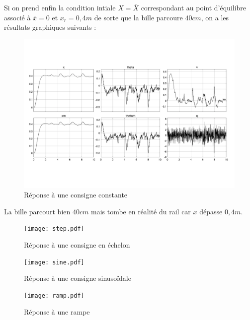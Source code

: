 \documentclass[10pt]{article}
\begin{document}
\noindent Si on prend enfin la condition intiale $X = \bar X$ correspondant au point d'équilibre associé à $\bar x = 0$
et $x_r = 0,4 m$ de sorte que la bille parcoure $40 cm$, on a les résultats graphiques suivants :

\begin{figure}[H]
	\centering
	\includegraphics[width=\linewidth]{resultat.pdf}
	\caption{Réponse à une consigne constante}
\end{figure}

\noindent La bille parcourt bien $40cm$ mais tombe en réalité du rail car $x$ dépasse $0,4m$.

\vspace{10px}

\noindent {}

\begin{figure}[H]
	\centering
	\texttt{[image: step.pdf]}
	\caption{Réponse à une consigne en échelon}
\end{figure}

\begin{figure}[H]
	\centering
	\texttt{[image: sine.pdf]}
	\caption{Réponse à une consigne sinusoïdale}
\end{figure}

\begin{figure}[H]
	\centering
	\texttt{[image: ramp.pdf]}
	\caption{Réponse à une rampe}
\end{figure}
\end{document}
